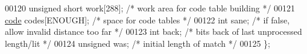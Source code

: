 \begin{DoxyCode}
00120     \textcolor{keywordtype}{unsigned} \textcolor{keywordtype}{short} work[288];   \textcolor{comment}{/* work area for code table building */}
00121     \hyperlink{structcode}{code} codes[ENOUGH];         \textcolor{comment}{/* space for code tables */}
00122     \textcolor{keywordtype}{int} sane;                   \textcolor{comment}{/* if false, allow invalid distance too far */}
00123     \textcolor{keywordtype}{int} back;                   \textcolor{comment}{/* bits back of last unprocessed length/lit */}
00124     \textcolor{keywordtype}{unsigned} was;               \textcolor{comment}{/* initial length of match */}
00125 \};
\end{DoxyCode}
